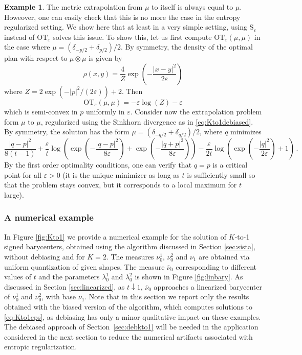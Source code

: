 \documentclass[12pt]{amsart}
\numberwithin{equation}{section}
\let\mr=\mathrm
\theoremstyle{plain}
\theoremstyle{definition}
\newtheorem{example}[theorem]{Example}
\begin{document}
\begin{example} The metric extrapolation from $\mu$ to itself is always equal to $\mu$. Howeover, one can easily check that this is no more the case in the entropy regularized setting. We show here that at least in a very simple setting, using $\mr{S}_\varepsilon$ instead of $\mr{OT}_\varepsilon$ solves this issue. To show this, let us first compute $\mr{OT}_\varepsilon(\mu,\mu)$ in the case where $\mu = (\delta_{-p/2} + \delta_{p/2})/2$. By symmetry,  the density of the optimal plan with respect to $\mu\otimes \mu$ is given by
\[
\rho(x,y) = \frac{4}{Z} \exp \left(-\frac{|x-y|^2}{2\varepsilon}\right)
\]
where $Z = 2 \exp(-|p|^2/(2\varepsilon)) + 2$.
Then
\[
\mr{OT}_{\varepsilon}(\mu,\mu) = -\varepsilon \log(Z) - \varepsilon
\]
which is semi-convex in $p$ uniformly in $\varepsilon$.
Consider now the extrapolation problem form $\mu$ to $\mu$, regularized using the Sinkhorn divergence as in \eqref{eq:Kto1debiased}. By symmetry, the solution has the form $\mu =  (\delta_{-q/2} + \delta_{q/2})/2$, where $q$ minimizes
\[
\frac{|q-p|^2}{8(t-1)} + \frac{\varepsilon}{t}\log\left( \exp\left(-\frac{|q-p|^2}{8\varepsilon}\right) +  \exp\left(-\frac{|q+p|^2}{8\varepsilon}\right)\right) - \frac{\varepsilon}{2t} \log\left( \exp\left(-\frac{|q|^2}{2\varepsilon}\right) + 1\right)\,. 
\]
By the first order optimality conditions, one can verify that $q =p$ is a critical point for all $\varepsilon>0$ (it is the unique minimizer as long as $t$ is sufficiently small so that the problem stays convex, but it corresponds to a local maximum for $t$ large).
\end{example}


\subsubsection{A numerical example} In Figure \ref{fig:Kto1} we provide a numerical example for the solution of $K$-to-1 signed barycenters, obtained using the algorithm discussed in Section \ref{sec:sista}, without debiasing and for $K=2$. 
The measures $\nu_0^1$, $\nu_0^2$ and $\nu_1$ are obtained via uniform quantization of given shapes. The measure $\overline{\nu}_0$ corresponding to different values of $t$ and the parameters $\lambda_0^1$ and $\lambda_0^2$ is shown in Figure \ref{fig:linbary}. As discussed in Section \ref{sec:linearized}, as $t\downarrow 1$, $\overline{\nu}_0$ approaches a linearized barycenter of $\nu_0^1$ and $\nu_0^2$, with base $\nu_1$. Note that in this section we report only the results obtained with the biased version of the algorithm, which computes solutions to \eqref{eq:Kto1eps}, as debiasing has only a minor qualitative impact on these examples. The debiased approach of Section~\ref{sec:debkto1} will be needed in the application considered in the next section to reduce the numerical artifacts associated with  entropic regularization.
\end{document}
